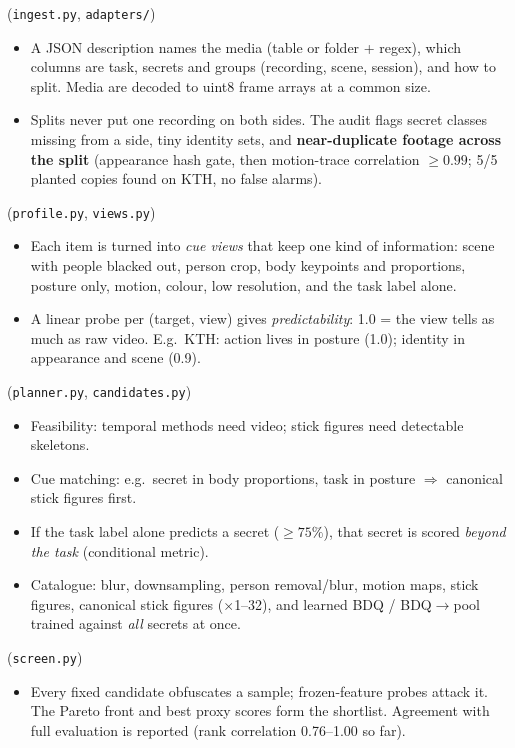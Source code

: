 \documentclass[10pt]{article}
\newcommand{\sect}[1]{\par\vspace{4pt}{\color{acc}\bfseries #1}\par\vspace{1pt}}
\begin{document}
\begin{minipage}[t]{0.49\textwidth}
\sect{1. Ingest} (\texttt{ingest.py}, \texttt{adapters/})
\begin{itemize}
\item A JSON description names the media (table or folder + regex), which columns are task, secrets and groups
  (recording, scene, session), and how to split. Media are decoded to uint8 frame arrays at a common size.
\item Splits never put one recording on both sides. The audit flags secret classes missing from a side, tiny
  identity sets, and \textbf{near-duplicate footage across the split} (appearance hash gate, then motion-trace
  correlation $\geq 0.99$; 5/5 planted copies found on KTH, no false alarms).
\end{itemize}

\sect{2. Profile} (\texttt{profile.py}, \texttt{views.py})
\begin{itemize}
\item Each item is turned into \emph{cue views} that keep one kind of information: scene with people blacked out,
  person crop, body keypoints and proportions, posture only, motion, colour, low resolution, and the task label
  alone.
\item A linear probe per (target, view) gives \emph{predictability}: 1.0 = the view tells as much as raw video.
  E.g.\ KTH: action lives in posture (1.0); identity in appearance and scene (0.9).
\end{itemize}

\sect{3. Plan} (\texttt{planner.py}, \texttt{candidates.py})
\begin{itemize}
\item Feasibility: temporal methods need video; stick figures need detectable skeletons.
\item Cue matching: e.g.\ secret in body proportions, task in posture $\Rightarrow$ canonical stick figures first.
\item If the task label alone predicts a secret ($\geq 75\%$), that secret is scored \emph{beyond the task} (conditional metric).
\item Catalogue: blur, downsampling, person removal/blur, motion maps, stick figures, canonical stick figures
  ($\times$1--32), and learned BDQ / BDQ$\to$pool trained against \emph{all} secrets at once.
\end{itemize}

\sect{4. Screen} (\texttt{screen.py})
\begin{itemize}
\item Every fixed candidate obfuscates a sample; frozen-feature probes attack it. The Pareto front and best proxy
  scores form the shortlist. Agreement with full evaluation is reported (rank correlation 0.76--1.00 so far).
\end{itemize}
\end{minipage}\hfill
\end{document}
